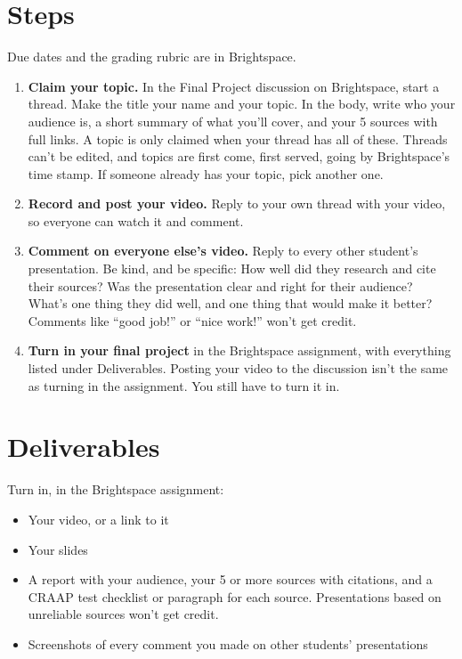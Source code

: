 \documentclass[12pt]{article}
\begin{document}
\section*{Steps}
Due dates and the grading rubric are in Brightspace.
\begin{enumerate}
    \item \textbf{Claim your topic.} In the Final Project discussion on Brightspace, start a thread. Make the title your name and your topic. In the body, write who your audience is, a short summary of what you'll cover, and your 5 sources with full links. A topic is only claimed when your thread has all of these. Threads can't be edited, and topics are first come, first served, going by Brightspace's time stamp. If someone already has your topic, pick another one.
    \item \textbf{Record and post your video.} Reply to your own thread with your video, so everyone can watch it and comment.
    \item \textbf{Comment on everyone else's video.} Reply to every other student's presentation. Be kind, and be specific: How well did they research and cite their sources? Was the presentation clear and right for their audience? What's one thing they did well, and one thing that would make it better? Comments like ``good job!'' or ``nice work!'' won't get credit.
    \item \textbf{Turn in your final project} in the Brightspace assignment, with everything listed under Deliverables. Posting your video to the discussion isn't the same as turning in the assignment. You still have to turn it in.
\end{enumerate}

\section*{Deliverables}
Turn in, in the Brightspace assignment:
\begin{itemize}
    \item Your video, or a link to it
    \item Your slides
    \item A report with your audience, your 5 or more sources with citations, and a CRAAP test checklist or paragraph for each source. Presentations based on unreliable sources won't get credit.
    \item Screenshots of every comment you made on other students' presentations
\end{itemize}
\end{document}
